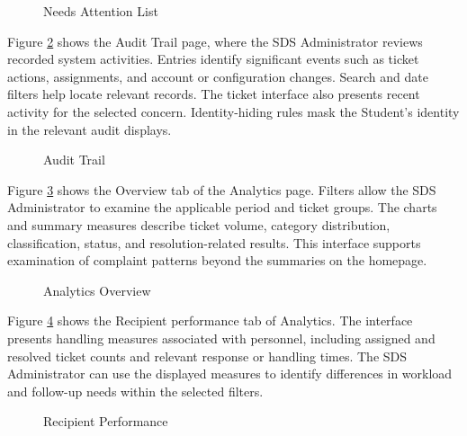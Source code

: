 \renewcommand{\thefigure}{5.28}
\begin{figure}[htbp]
    \centering
    \caption{Needs Attention List}
    \label{fig:attn}
\end{figure}
\FloatBarrier

Figure \ref{fig:audit} shows the Audit Trail page, where the SDS Administrator reviews recorded system activities. Entries identify significant events such as ticket actions, assignments, and account or configuration changes. Search and date filters help locate relevant records. The ticket interface also presents recent activity for the selected concern. Identity-hiding rules mask the Student's identity in the relevant audit displays.

\renewcommand{\thefigure}{5.29}
\begin{figure}[htbp]
    \centering
    \caption{Audit Trail}
    \label{fig:audit}
\end{figure}
\FloatBarrier

Figure \ref{fig:stats} shows the Overview tab of the Analytics page. Filters allow the SDS Administrator to examine the applicable period and ticket groups. The charts and summary measures describe ticket volume, category distribution, classification, status, and resolution-related results. This interface supports examination of complaint patterns beyond the summaries on the homepage.

\renewcommand{\thefigure}{5.30}
\begin{figure}[htbp]
    \centering
    \caption{Analytics Overview}
    \label{fig:stats}
\end{figure}
\FloatBarrier

Figure \ref{fig:perf} shows the Recipient performance tab of Analytics. The interface presents handling measures associated with personnel, including assigned and resolved ticket counts and relevant response or handling times. The SDS Administrator can use the displayed measures to identify differences in workload and follow-up needs within the selected filters.

\renewcommand{\thefigure}{5.31}
\begin{figure}[htbp]
    \centering
    \caption{Recipient Performance}
    \label{fig:perf}
\end{figure}
\FloatBarrier

